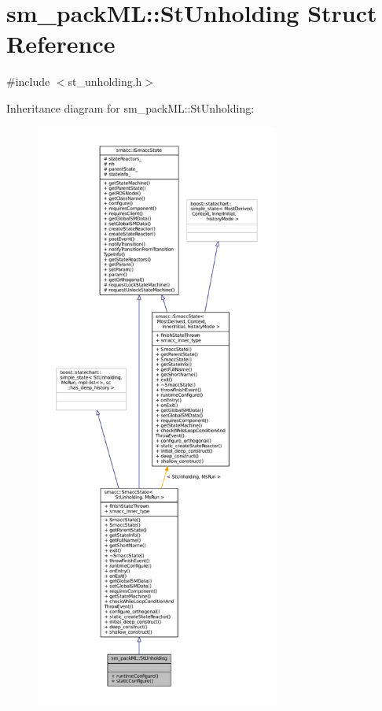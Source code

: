 \hypertarget{structsm__packML_1_1StUnholding}{}\section{sm\+\_\+pack\+ML\+:\+:St\+Unholding Struct Reference}
\label{structsm__packML_1_1StUnholding}


{\ttfamily \#include $<$st\+\_\+unholding.\+h$>$}



Inheritance diagram for sm\+\_\+pack\+ML\+:\+:St\+Unholding\+:
\nopagebreak
\begin{figure}[H]
\begin{center}
\leavevmode
\includegraphics[height=550pt]{structsm__packML_1_1StUnholding__inherit__graph}
\end{center}
\end{figure}


